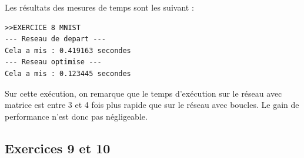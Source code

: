 \documentclass[a4paper,11pt]{article}
\begin{document}
Les résultats des mesures de temps sont les suivant : 

\begin{verbatim}
>>EXERCICE 8 MNIST
--- Reseau de depart ---
Cela a mis : 0.419163 secondes
--- Reseau optimise ---
Cela a mis : 0.123445 secondes
\end{verbatim}

Sur cette exécution, on remarque que le temps d'exécution sur le réseau avec matrice est entre 3 et 4 fois plus rapide que sur le réseau avec boucles. Le gain de performance n'est donc pas négligeable.

\subsection{Exercices 9 et 10}
\end{document}
